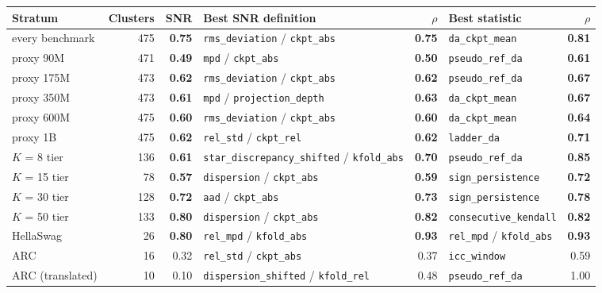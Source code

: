 \begin{table}[t]
\centering
\scriptsize
\begin{adjustbox}{max width=\textwidth}
\begin{tabular}{@{}lrrlrlr@{}}
\toprule
\textbf{Stratum} & \textbf{Clusters} & \textbf{SNR} & \textbf{Best SNR definition} & $\rho$ & \textbf{Best statistic} & $\rho$ \\
\midrule
every benchmark & 475 & \textbf{0.75} & \texttt{rms\_deviation} / \texttt{ckpt\_abs} & \textbf{0.75} & \texttt{da\_ckpt\_mean} & \textbf{0.81} \\
\midrule
proxy 90M & 471 & \textbf{0.49} & \texttt{mpd} / \texttt{ckpt\_abs} & \textbf{0.50} & \texttt{pseudo\_ref\_da} & \textbf{0.61} \\
proxy 175M & 473 & \textbf{0.62} & \texttt{rms\_deviation} / \texttt{ckpt\_abs} & \textbf{0.62} & \texttt{pseudo\_ref\_da} & \textbf{0.67} \\
proxy 350M & 473 & \textbf{0.61} & \texttt{mpd} / \texttt{projection\_depth} & \textbf{0.63} & \texttt{da\_ckpt\_mean} & \textbf{0.67} \\
proxy 600M & 475 & \textbf{0.60} & \texttt{rms\_deviation} / \texttt{ckpt\_abs} & \textbf{0.60} & \texttt{da\_ckpt\_mean} & \textbf{0.64} \\
proxy 1B & 475 & \textbf{0.62} & \texttt{rel\_std} / \texttt{ckpt\_rel} & \textbf{0.62} & \texttt{ladder\_da} & \textbf{0.71} \\
\midrule
$K$ = 8 tier & 136 & \textbf{0.61} & \texttt{star\_discrepancy\_shifted} / \texttt{kfold\_abs} & \textbf{0.70} & \texttt{pseudo\_ref\_da} & \textbf{0.85} \\
$K$ = 15 tier & 78 & \textbf{0.57} & \texttt{dispersion} / \texttt{ckpt\_abs} & \textbf{0.59} & \texttt{sign\_persistence} & \textbf{0.72} \\
$K$ = 30 tier & 128 & \textbf{0.72} & \texttt{aad} / \texttt{ckpt\_abs} & \textbf{0.73} & \texttt{sign\_persistence} & \textbf{0.78} \\
$K$ = 50 tier & 133 & \textbf{0.80} & \texttt{dispersion} / \texttt{ckpt\_abs} & \textbf{0.82} & \texttt{consecutive\_kendall} & \textbf{0.82} \\
\midrule
HellaSwag & 26 & \textbf{0.80} & \texttt{rel\_mpd} / \texttt{kfold\_abs} & \textbf{0.93} & \texttt{rel\_mpd} / \texttt{kfold\_abs} & \textbf{0.93} \\
ARC & 16 & 0.32 & \texttt{rel\_std} / \texttt{ckpt\_abs} & 0.37 & \texttt{icc\_window} & 0.59 \\
ARC (translated) & 10 & 0.10 & \texttt{dispersion\_shifted} / \texttt{kfold\_rel} & 0.48 & \texttt{pseudo\_ref\_da} & 1.00 \\

\end{tabular}
\end{adjustbox}
\end{table}
